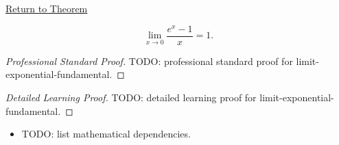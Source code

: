 \newpage
{}
\label{prf:limit-exponential-fundamental}

\begin{remark*}[Return]
\hyperref[prop:limit-exponential-fundamental]{Return to Theorem}
\end{remark*}

\begin{theorem*}
\[
  \lim_{x \to 0} \frac{e^x - 1}{x} = 1.
\]

\smallskip\noindent
\end{theorem*}

\begin{proof}[Professional Standard Proof]
\LRAProofBodyStart
TODO: professional standard proof for limit-exponential-fundamental.
\end{proof}

\begin{proof}[Detailed Learning Proof]
\LRAProofBodyStart
TODO: detailed learning proof for limit-exponential-fundamental.
\end{proof}

\begin{remark*}
\end{remark*}

\begin{dependencies}
\begin{itemize}
  \item TODO: list mathematical dependencies.
\end{itemize}
\end{dependencies}

\clearpage
